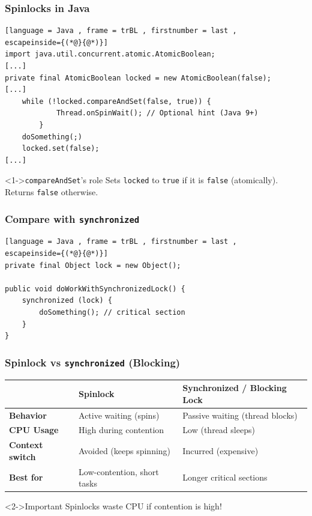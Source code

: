 \documentclass[xcolor={dvipsnames,svgnames},aspectratio=169]{beamer}
\begin{document}
\begin{frame}[fragile]
  \frametitle{Spinlocks in Java}

\begin{lstlisting}[language = Java , frame = trBL , firstnumber = last ,
escapeinside={(*@}{@*)}]
import java.util.concurrent.atomic.AtomicBoolean;
[...]
private final AtomicBoolean locked = new AtomicBoolean(false);
[...]
    while (!locked.compareAndSet(false, true)) {
            Thread.onSpinWait(); // Optional hint (Java 9+)
        }
    doSomething(;)
    locked.set(false);
[...]
\end{lstlisting}

  \begin{block}<1->{\faLightbulb \quad \texttt{compareAndSet}'s role}
  Sets \texttt{locked} to \texttt{true} if it is \texttt{false} (atomically).
  Returns \texttt{false} otherwise.
  \end{block}
\end{frame}

\begin{frame}[fragile]
  \frametitle{Compare with \texttt{synchronized}}

\begin{lstlisting}[language = Java , frame = trBL , firstnumber = last ,
escapeinside={(*@}{@*)}]
private final Object lock = new Object();

public void doWorkWithSynchronizedLock() {
    synchronized (lock) {
        doSomething(); // critical section
    }
}
\end{lstlisting}

\end{frame}

\begin{frame}[fragile]
  \frametitle{Spinlock vs \texttt{synchronized} (Blocking)}
  \begin{table}[]
    \centering
    \begin{tabular}{l|l|l}
        \toprule
      \textbf{}
      & \textbf{Spinlock}
      & \textbf{Synchronized / Blocking Lock} \\
        \midrule
      \textbf{Behavior}
      & Active waiting (spins)
      & Passive waiting (thread blocks)\\
        \midrule
      \textbf{CPU Usage}
      & High during contention
      & Low (thread sleeps)\\
        \midrule
      \textbf{Context switch}
      & Avoided (keeps spinning)
      & Incurred (expensive) \\
        \midrule
      \textbf{Best for}
      & Low-contention, short tasks
      & Longer critical sections \\
        \bottomrule
    \end{tabular}
  \end{table}

  \begin{block}<2->{\faExclamationTriangle \quad Important}
    Spinlocks waste CPU if contention is high!
  \end{block}
\end{frame}
\end{document}
